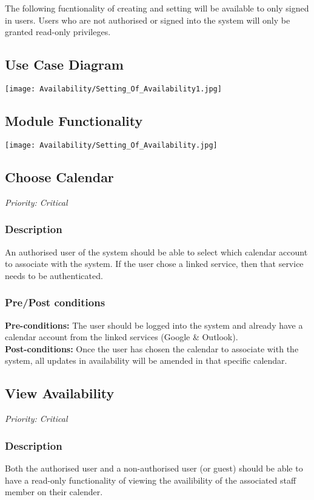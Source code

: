 The following fucntionality of creating and setting will be available to only signed in users. Users who are not authorised or signed into the system will only be granted read-only privileges.
\subsection{Use Case Diagram}
\texttt{[image: Availability/Setting\_Of\_Availability1.jpg]}

\subsection{Module Functionality}
\texttt{[image: Availability/Setting\_Of\_Availability.jpg]}


\subsection{Choose Calendar}
\textit{Priority: Critical}
	\subsubsection{Description}
	An authorised user of the system should be able to select which calendar account to associate with the system. If the user chose a linked service, then that service needs to be authenticated.\\
	\subsubsection{Pre/Post conditions}
		\textbf{Pre-conditions:} The user should be logged into the system and already have a calendar account from the linked services (Google \& Outlook). \\
		\textbf{Post-conditions:} Once the user has chosen the calendar to associate with the system, all updates in availability will be amended in that specific calendar.

\subsection{View Availability}
\textit{Priority: Critical}
	\subsubsection{Description}
	Both the authorised user and a non-authorised user (or guest) should be able to have a read-only functionality of viewing the availibility of the associated staff member on their calender.\\
